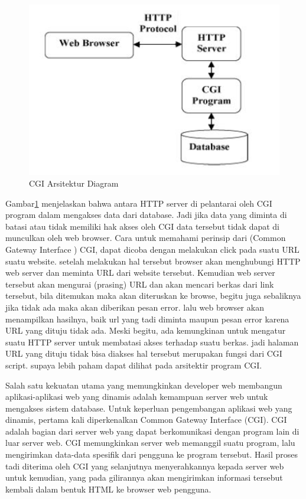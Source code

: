 \begin{figure}[ht]
\centerline{\includegraphics[width=1\textwidth]{figures/1arsitekturCGI.JPG}}

\caption{CGI Arsitektur Diagram} 
\label{1arsitekturCGI}
\end{figure}

Gambar\ref{1arsitekturCGI} menjelaskan bahwa antara HTTP server di pelantarai oleh CGI program dalam mengakses data 
dari database. Jadi jika data yang diminta di batasi atau tidak memiliki hak akses oleh CGI data tersebut tidak dapat di munculkan 
oleh web browser.  Cara untuk memahami perinsip dari (Common Gateway Interface ) CGI, dapat dicoba dengan melakukan click pada suatu URL suatu website.
setelah melakukan hal tersebut browser akan menghubungi HTTP web server dan meminta URL dari website tersebut. Kemudian web server tersebut akan
mengurai (prasing) URL dan akan mencari berkas dari link tersebut, bila ditemukan maka akan diteruskan ke browse, begitu juga sebaliknya jika tidak ada
maka akan diberikan pesan error. lalu web browser akan menampilkan hasilnya, baik url yang tadi diminta maupun pesan error karena URL yang dituju tidak ada. Meski begitu, ada kemungkinan untuk mengatur suatu HTTP server untuk membatasi akses terhadap suatu berkas.
jadi halaman URL yang dituju tidak bisa diakses hal tersebut merupakan fungsi dari CGI script. supaya lebih paham dapat dilihat 
pada arsitektir program CGI.



\par Salah satu kekuatan utama yang memungkinkan developer web membangun aplikasi-aplikasi web yang dinamis adalah kemampuan server web untuk mengakses sistem database. Untuk keperluan pengembangan aplikasi web yang dinamis, pertama kali diperkenalkan Common Gateway Interface (CGI). CGI adalah bagian dari server web yang dapat berkomunikasi dengan program lain di luar server web. CGI memungkinkan server web memanggil suatu program, lalu mengirimkan data-data spesifik dari pengguna ke program tersebut. Hasil proses tadi diterima oleh CGI yang selanjutnya menyerahkannya kepada server web untuk kemudian, yang pada gilirannya akan mengirimkan informasi tersebut kembali dalam bentuk HTML ke browser web pengguna\cite{ibrahim2011sistem}.


